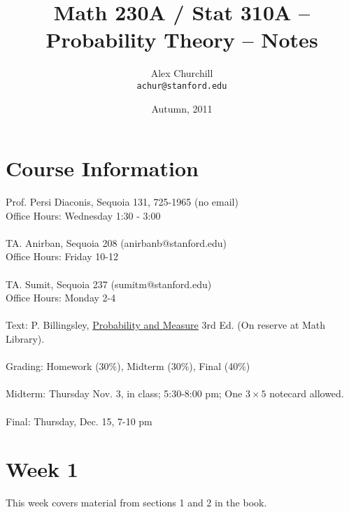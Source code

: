 \documentclass[12pt]{article}
\title{Math 230A / Stat 310A -- Probability Theory -- Notes}
\author{
Alex Churchill\\
\small \texttt{achur@stanford.edu}
}
\date{Autumn, 2011}
\begin{document}
\maketitle
\thispagestyle{empty} %
\tableofcontents


\newpage

\setcounter{page}{1} %

\section{Course Information}
Prof. Persi Diaconis, Sequoia 131, 725-1965 (no email) \\
Office Hours: Wednesday 1:30 - 3:00
\\ \\
TA. Anirban, Sequoia 208 (anirbanb@stanford.edu) \\
Office Hours: Friday 10-12
\\ \\
TA. Sumit, Sequoia 237 (sumitm@stanford.edu) \\
Office Hours: Monday 2-4
\\ \\
Text: P. Billingsley, \underline{Probability and Measure} 3rd Ed. (On reserve at Math Library).
\\ \\
Grading: Homework (30\%), Midterm (30\%), Final (40\%)
\\ \\
Midterm: Thursday Nov. 3, in class; 5:30-8:00 pm; One $3 \times 5$ notecard allowed.
\\ \\
Final: Thursday, Dec. 15, 7-10 pm

\section{Week 1}
This week covers material from sections 1 and 2 in the book.
\end{document}
